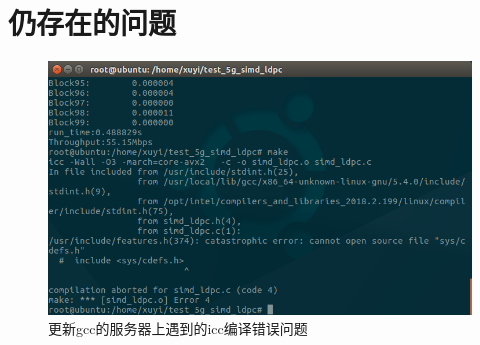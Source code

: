 \documentclass{article}
\begin{document}
\section{仍存在的问题}
\begin{figure}[H]
	\centering
	\includegraphics[width = .8\textwidth]{ierr.png}
	\caption{更新gcc的服务器上遇到的icc编译错误问题}
\end{figure}

\end{document}

